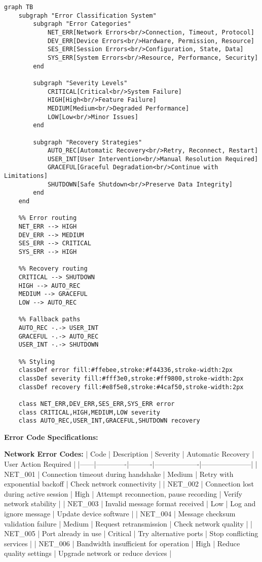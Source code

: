\documentclass[11pt,a4paper]{article}
\begin{document}
\begin{verbatim}
graph TB
    subgraph "Error Classification System"
        subgraph "Error Categories"
            NET_ERR[Network Errors<br/>Connection, Timeout, Protocol]
            DEV_ERR[Device Errors<br/>Hardware, Permission, Resource]
            SES_ERR[Session Errors<br/>Configuration, State, Data]
            SYS_ERR[System Errors<br/>Resource, Performance, Security]
        end

        subgraph "Severity Levels"
            CRITICAL[Critical<br/>System Failure]
            HIGH[High<br/>Feature Failure]
            MEDIUM[Medium<br/>Degraded Performance]
            LOW[Low<br/>Minor Issues]
        end

        subgraph "Recovery Strategies"
            AUTO_REC[Automatic Recovery<br/>Retry, Reconnect, Restart]
            USER_INT[User Intervention<br/>Manual Resolution Required]
            GRACEFUL[Graceful Degradation<br/>Continue with Limitations]
            SHUTDOWN[Safe Shutdown<br/>Preserve Data Integrity]
        end
    end

    %% Error routing
    NET_ERR --> HIGH
    DEV_ERR --> MEDIUM
    SES_ERR --> CRITICAL
    SYS_ERR --> HIGH

    %% Recovery routing
    CRITICAL --> SHUTDOWN
    HIGH --> AUTO_REC
    MEDIUM --> GRACEFUL
    LOW --> AUTO_REC

    %% Fallback paths
    AUTO_REC -.-> USER_INT
    GRACEFUL -.-> AUTO_REC
    USER_INT -.-> SHUTDOWN

    %% Styling
    classDef error fill:#ffebee,stroke:#f44336,stroke-width:2px
    classDef severity fill:#fff3e0,stroke:#ff9800,stroke-width:2px
    classDef recovery fill:#e8f5e8,stroke:#4caf50,stroke-width:2px

    class NET_ERR,DEV_ERR,SES_ERR,SYS_ERR error
    class CRITICAL,HIGH,MEDIUM,LOW severity
    class AUTO_REC,USER_INT,GRACEFUL,SHUTDOWN recovery
\end{verbatim}

\textbf{Error Code Specifications:}

\textbf{Network Error Codes:}
| Code | Description | Severity | Automatic Recovery | User Action Required |
|------|-------------|----------|-------------------|---------------------|
| NET\_001 | Connection timeout during handshake | Medium | Retry with exponential backoff | Check network connectivity |
| NET\_002 | Connection lost during active session | High | Attempt reconnection, pause recording | Verify network
stability |
| NET\_003 | Invalid message format received | Low | Log and ignore message | Update device software |
| NET\_004 | Message checksum validation failure | Medium | Request retransmission | Check network quality |
| NET\_005 | Port already in use | Critical | Try alternative ports | Stop conflicting services |
| NET\_006 | Bandwidth insufficient for operation | High | Reduce quality settings | Upgrade network or reduce devices |
\end{document}
